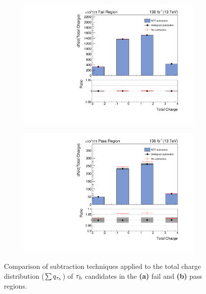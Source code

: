 \begin{figure}[h]
        \centering
        \begin{subfigure}[b]{0.49\textwidth}
            \centering
            \includegraphics[width=\textwidth]{Figures/Chapter6/subtraction_plot_q_sum_ttt_fail.pdf}
            \caption{}
        \end{subfigure}
        \vspace{0.5cm}
        \begin{subfigure}[b]{0.49\textwidth}
            \centering
            \includegraphics[width=\textwidth]{Figures/Chapter6/subtraction_plot_q_sum_ttt_pass.pdf}
            \caption{}
        \end{subfigure}
    \caption[Comparison of subtraction techniques applied to the total charge distribution of $\PGt_h$ candidates.]{Comparison of subtraction techniques applied to the total charge distribution ($\sum q_{\tau_h}$) of $\PGt_h$ candidates in the \textbf{(a)} fail and \textbf{(b)} pass regions.}

    \label{Figure:Chapter6_BDTPurificationExample}
\end{figure}

